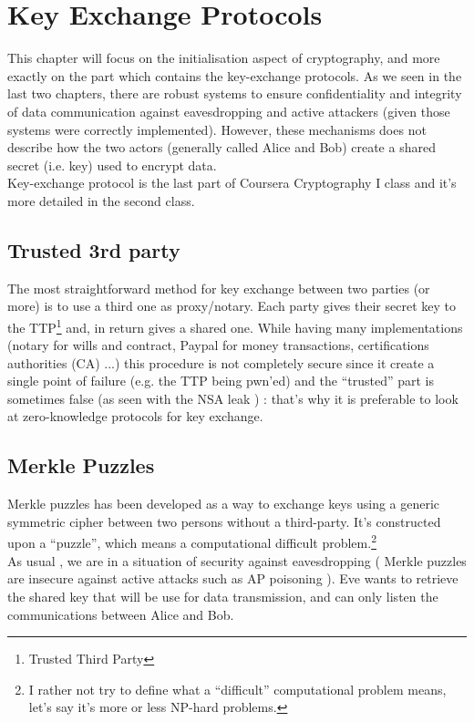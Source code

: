 \chapter{Key Exchange Protocols}

This chapter will focus on the initialisation aspect of cryptography, and more exactly on the part which contains the key-exchange protocols. As we seen in the last two chapters, there are robust systems to ensure confidentiality and integrity of data communication against eavesdropping and active attackers (given  those systems were correctly implemented). However, these mechanisms does not describe how the two actors (generally called Alice and Bob) create a shared secret (i.e. key) used to encrypt data. \\
Key-exchange protocol is the last part of Coursera Cryptography I class and it's more detailed in the second class.

\section{Trusted 3rd party}

The most straightforward method for key exchange between two parties (or more) is to use a third one as proxy/notary. Each party gives their secret key to the TTP\footnote{Trusted Third Party} and, in return gives a shared one. While having many implementations (notary for wills and contract, Paypal for money transactions, certifications authorities (CA) ...) this procedure is not completely secure since it create a single point of failure (e.g. the TTP being pwn'ed) and the ``trusted'' part is sometimes false (as seen with the NSA leak ) : that's why it is preferable to look at zero-knowledge protocols for key exchange.


\section{Merkle Puzzles}
Merkle puzzles has been developed as a way to exchange keys using a generic symmetric cipher between two persons without a third-party. It's constructed upon a ``puzzle'', which means a computational difficult problem.\footnote{I rather not try to define what a ``difficult'' computational problem means, let's say it's more or less NP-hard problems.} \\
As usual , we are in a situation of security against eavesdropping ( Merkle puzzles are insecure against active attacks such as AP poisoning ). Eve wants to retrieve the shared key that will be use for data transmission, and can only listen the communications between Alice and Bob. \\

